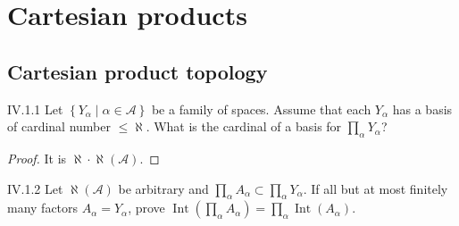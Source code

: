 \chapter{Cartesian products}

\section{Cartesian product topology}

\begin{problem}{IV.1.1}
Let \( \left\{ Y_{\alpha} \mid \alpha \in \mathscr{A} \right\} \) be a family of spaces. Assume that each \( Y_{\alpha} \) has a basis of cardinal number \( \le \aleph \). What is the cardinal of a basis for \( \prod_{\alpha} Y_{\alpha} \)?
\end{problem}

\begin{proof}
	It is \( \aleph \cdot \aleph(\mathscr{A}) \).
\end{proof}

\begin{problem}{IV.1.2}
Let \( \aleph(\mathscr{A}) \) be arbitrary and \( \prod_{\alpha} A_{\alpha} \subset \prod_{\alpha} Y_{\alpha} \). If all but at most finitely many factors \( A_{\alpha} = Y_{\alpha} \), prove \( \operatorname{Int}\left( \prod_{\alpha} A_{\alpha} \right) = \prod_{\alpha} \operatorname{Int}(A_{\alpha}) \).
\end{problem}

